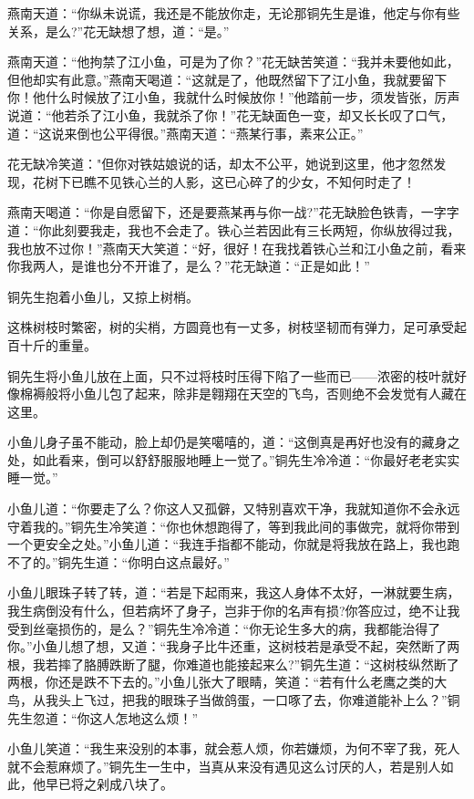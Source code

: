 \documentclass[12pt,oneside]{book}
\begin{document}
燕南天道：``你纵未说谎，我还是不能放你走，无论那铜先生是谁，他定与你有些关系，是么?''花无缺想了想，道：``是。''

燕南天道：``他拘禁了江小鱼，可是为了你？''花无缺苦笑道：``我并未要他如此，但他却实有此意。''燕南天喝道：``这就是了，他既然留下了江小鱼，我就要留下你！他什么时候放了江小鱼，我就什么时候放你！''他踏前一步，须发皆张，厉声说道：``他若杀了江小鱼，我就杀了你！''花无缺面色一变，却又长长叹了口气，道：``这说来倒也公平得很。''燕南天道：``燕某行事，素来公正。''

花无缺冷笑道："但你对铁姑娘说的话，却太不公平，她说到这里，他才忽然发现，花树下已瞧不见铁心兰的人影，这已心碎了的少女，不知何时走了！

燕南天喝道：``你是自愿留下，还是要燕某再与你一战?''花无缺脸色铁青，一字字道：``你此刻要我走，我也不会走了。铁心兰若因此有三长两短，你纵放得过我，我也放不过你！''燕南天大笑道：``好，很好！在我找着铁心兰和江小鱼之前，看来你我两人，是谁也分不开谁了，是么？''花无缺道：``正是如此！''

铜先生抱着小鱼儿，又掠上树梢。

这株树枝时繁密，树的尖梢，方圆竟也有一丈多，树枝坚韧而有弹力，足可承受起百十斤的重量。

铜先生将小鱼儿放在上面，只不过将枝时压得下陷了一些而已------浓密的枝叶就好像棉褥般将小鱼儿包了起来，除非是翱翔在天空的飞鸟，否则绝不会发觉有人藏在这里。

小鱼儿身子虽不能动，脸上却仍是笑噶嘻的，道：``这倒真是再好也没有的藏身之处，如此看来，倒可以舒舒服服地睡上一觉了。''铜先生冷冷道：``你最好老老实实睡一觉。''

小鱼儿道：``你要走了么？你这人又孤僻，又特别喜欢干净，我就知道你不会永远守着我的。''铜先生冷笑道：``你也休想跑得了，等到我此间的事做完，就将你带到一个更安全之处。''小鱼儿道：``我连手指都不能动，你就是将我放在路上，我也跑不了的。''铜先生道：``你明白这点最好。''

小鱼儿眼珠子转了转，道：``若是下起雨来，我这人身体不太好，一淋就要生病，我生病倒没有什么，但若病坏了身子，岂非于你的名声有损?你答应过，绝不让我受到丝毫损伤的，是么？''铜先生冷冷道：``你无论生多大的病，我都能治得了你。''小鱼儿想了想，又道：``我身子比牛还重，这树枝若是承受不起，突然断了两根，我若摔了胳膊跌断了腿，你难道也能接起来么?''铜先生道：``这树枝纵然断了两根，你还是跌不下去的。''小鱼儿张大了眼睛，笑道：``若有什么老鹰之类的大鸟，从我头上飞过，把我的眼珠子当做鸽蛋，一口啄了去，你难道能补上么？''铜先生忽道：``你这人怎地这么烦！''

小鱼儿笑道：``我生来没别的本事，就会惹人烦，你若嫌烦，为何不宰了我，死人就不会惹麻烦了。''铜先生一生中，当真从来没有遇见这么讨厌的人，若是别人如此，他早已将之剁成八块了。
\end{document}
